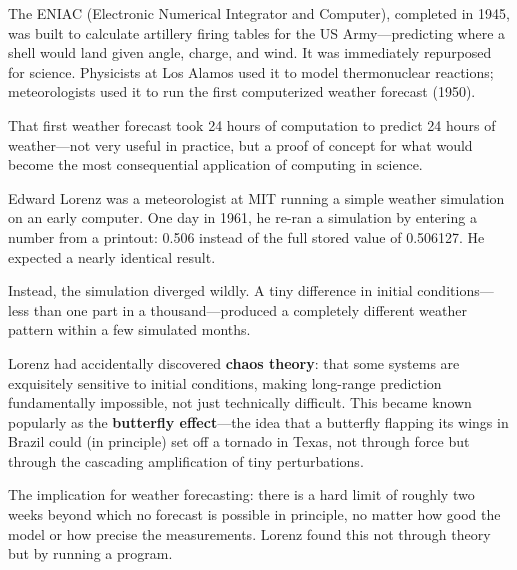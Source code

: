 \documentclass[11pt,letterpaper]{article}
\newcommand{\keyterm}[1]{\textbf{\textcolor{cssecondary}{#1}}}
\begin{document}
\begin{historybox}
The ENIAC (Electronic Numerical Integrator and Computer), completed in 1945, was built to calculate artillery firing tables for the US Army---predicting where a shell would land given angle, charge, and wind. It was immediately repurposed for science. Physicists at Los Alamos used it to model thermonuclear reactions; meteorologists used it to run the first computerized weather forecast (1950).

That first weather forecast took 24 hours of computation to predict 24 hours of weather---not very useful in practice, but a proof of concept for what would become the most consequential application of computing in science.
\end{historybox}

\begin{historybox}
Edward Lorenz was a meteorologist at MIT running a simple weather simulation on an early computer. One day in 1961, he re-ran a simulation by entering a number from a printout: 0.506 instead of the full stored value of 0.506127. He expected a nearly identical result.

Instead, the simulation diverged wildly. A tiny difference in initial conditions---less than one part in a thousand---produced a completely different weather pattern within a few simulated months.

Lorenz had accidentally discovered \keyterm{chaos theory}: that some systems are exquisitely sensitive to initial conditions, making long-range prediction fundamentally impossible, not just technically difficult. This became known popularly as the \textbf{butterfly effect}---the idea that a butterfly flapping its wings in Brazil could (in principle) set off a tornado in Texas, not through force but through the cascading amplification of tiny perturbations.

The implication for weather forecasting: there is a hard limit of roughly two weeks beyond which no forecast is possible in principle, no matter how good the model or how precise the measurements. Lorenz found this not through theory but by running a program.
\end{historybox}
\end{document}
